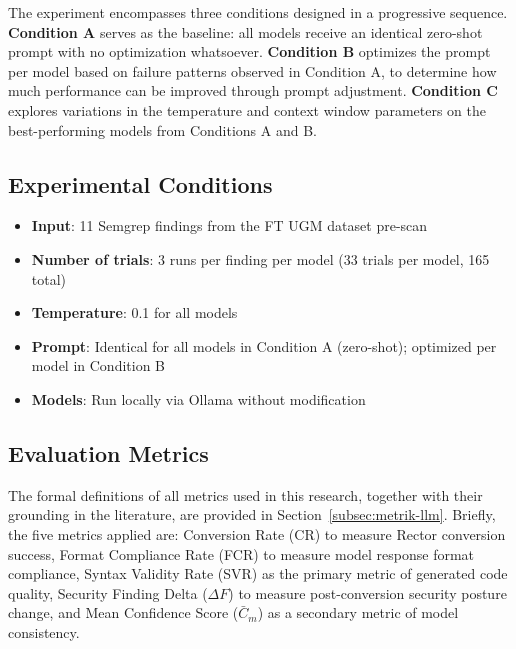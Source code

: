 The experiment encompasses three conditions designed in a progressive sequence. \textbf{Condition A} serves as the baseline: all models receive an identical zero-shot prompt with no optimization whatsoever. \textbf{Condition B} optimizes the prompt per model based on failure patterns observed in Condition A, to determine how much performance can be improved through prompt adjustment. \textbf{Condition C} explores variations in the temperature and context window parameters on the best-performing models from Conditions A and B.

\subsection{Experimental Conditions}

\begin{itemize}

    \item \textbf{Input}: 11 Semgrep findings from the FT UGM dataset pre-scan

    \item \textbf{Number of trials}: 3 runs per finding per model (33 trials per model, 165 total)

    \item \textbf{Temperature}: 0.1 for all models

    \item \textbf{Prompt}: Identical for all models in Condition A (zero-shot); optimized per model in Condition B

    \item \textbf{Models}: Run locally via Ollama without modification

\end{itemize}

\subsection{Evaluation Metrics}
\label{sec:metrik-evaluasi}

The formal definitions of all metrics used in this research, together with their grounding in the literature, are provided in Section~\ref{subsec:metrik-llm}. Briefly, the five metrics applied are: Conversion Rate (CR) to measure Rector conversion success, Format Compliance Rate (FCR) to measure model response format compliance, Syntax Validity Rate (SVR) as the primary metric of generated code quality, Security Finding Delta ($\Delta F$) to measure post-conversion security posture change, and Mean Confidence Score ($\bar{C}_m$) as a secondary metric of model consistency.

